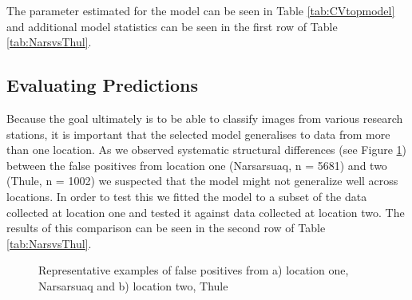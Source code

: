 \documentclass[12pt]{article}
\begin{document}
The parameter estimated for the model can be seen in Table \ref{tab:CVtopmodel} and additional model statistics can be seen in the first row of Table \ref{tab:NarsvsThul}.




\subsection{Evaluating Predictions}\label{modeleval}
Because the goal ultimately is to be able to classify images from various research stations, it is important that the selected model generalises to data from more than one location. As we observed systematic structural differences (see Figure \ref{fig:falsepositives}) between the false positives from location one (Narsarsuaq, n = 5681) and two (Thule, n = 1002) we suspected that the model might not generalize well across locations. In order to test this we fitted the model to a subset of the data collected at location one  and tested it against data collected at location two. The results of this comparison can be seen in the second row of Table \ref{tab:NarsvsThul}.

\begin{figure}[ht]
	\begin{center}
		\hfill
		\caption{Representative examples of false positives from a) location one, Narsarsuaq and b) location two, Thule} 
		\label{fig:falsepositives}
	\end{center}
\end{figure}
\end{document}
